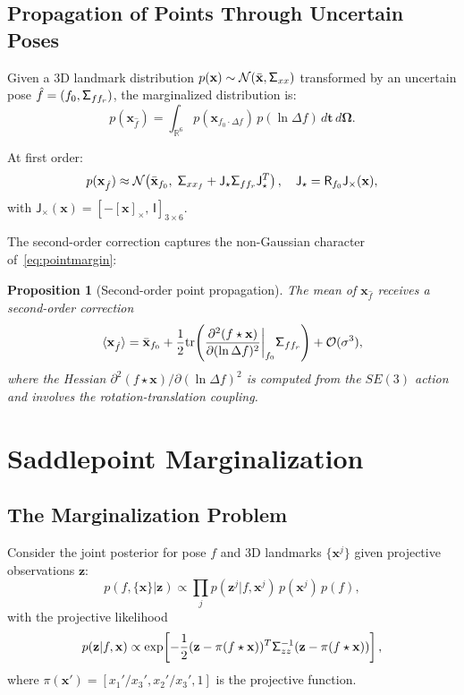 \documentclass[journal]{IEEEtran}
\newcommand{\real}{\mathbb{R}}
\newcommand{\bfOmega}{\boldsymbol{\Omega}}
\newcommand{\sfSigma}[1]{\mathsf{\Sigma}_\mathnormal{#1}}
\newcommand{\beq}{\begin{equation}}
\newcommand{\eeq}{\end{equation}}
\newtheorem{proposition}{Proposition}
\begin{document}
\subsection{Propagation of Points Through Uncertain Poses}

Given a 3D landmark distribution $p(\mathbf{x}) \sim 
\mathcal{N}(\bar{\mathbf{x}}, \sfSigma{xx})$ transformed 
by an uncertain pose $\hat{f} = (f_0, \sfSigma{ff_r})$, 
the marginalized distribution is:
\beq
    p(\mathbf{x}_{\hat{f}}) = \int_{\real^6}
    p(\mathbf{x}_{f_0 \cdot \Delta f})\, p(\ln \Delta f)\,
    d\mathbf{t}\, d\bfOmega.
    \label{eq:pointmargin}
\eeq

At first order:
\beq
    p(\mathbf{x}_{\hat{f}}) \approx 
    \mathcal{N}\!\left(\bar{\mathbf{x}}_{f_0},\;
    \sfSigma{xx_f} + \mathsf{J}_\star \sfSigma{ff_r} 
    \mathsf{J}_\star^T\right),\quad
    \mathsf{J}_\star = \mathsf{R}_{f_0}\mathsf{J}_\times(\mathbf{x}),
    \label{eq:pointfirstorder}
\eeq
with $\mathsf{J}_\times(\mathbf{x}) = [-[\mathbf{x}]_\times,\, 
\mathsf{I}]_{3 \times 6}$.

The second-order correction captures the non-Gaussian 
character of~\eqref{eq:pointmargin}:

\begin{proposition}[Second-order point propagation]
\label{prop:pointprop}
The mean of $\mathbf{x}_{\hat{f}}$ receives a 
second-order correction
\beq
    \langle \mathbf{x}_{\hat{f}} \rangle = 
    \bar{\mathbf{x}}_{f_0} + 
    \frac{1}{2}\mathrm{tr}\!\left(
    \frac{\partial^2 (f \star \mathbf{x})}{\partial (\ln \Delta f)^2}
    \bigg|_{f_0} \sfSigma{ff_r}\right)
    + \mathcal{O}(\sigma^3),
\eeq
where the Hessian $\partial^2(f\star\mathbf{x})/\partial(\ln\Delta f)^2$ 
is computed from the $SE(3)$ action and involves the 
rotation-translation coupling.
\end{proposition}

\section{Saddlepoint Marginalization}
\label{sec:saddlepoint}

\subsection{The Marginalization Problem}

Consider the joint posterior for pose $f$ and 3D 
landmarks $\{\mathbf{x}^j\}$ given projective 
observations $\mathbf{z}$:
\beq
    p(f, \{\mathbf{x}\} | \mathbf{z}) \propto 
    \prod_j p(\mathbf{z}^j | f, \mathbf{x}^j)\, 
    p(\mathbf{x}^j)\, p(f),
    \label{eq:jointposterior}
\eeq
with the projective likelihood
\beq
    p(\mathbf{z} | f, \mathbf{x}) \propto 
    \exp\!\left[-\frac{1}{2}
    (\mathbf{z} - \pi(f \star \mathbf{x}))^T
    \sfSigma{zz}^{-1}
    (\mathbf{z} - \pi(f \star \mathbf{x}))\right],
    \label{eq:projlikelihood}
\eeq
where $\pi(\mathbf{x}') = [x_1'/x_3', x_2'/x_3', 1]$ 
is the projective function.
\end{document}
